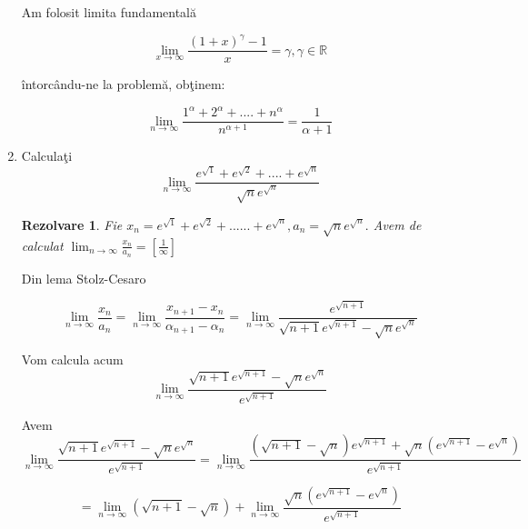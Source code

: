 \documentclass[a4paper,12pt,oneside]{report}
\newtheorem{solve}{Rezolvare}
\begin{document}
\begin{enumerate}
Am folosit limita fundamental\u a 

\begin{displaymath}
  \lim_{x \to \infty }\frac{\left ( 1+x \right )^{\gamma }-1}{x} = \gamma ,\gamma \in \mathbb{R}
\end{displaymath}


\^ intorc\^ andu-ne la problem\u a, ob\c tinem:

\begin{displaymath}
  \lim_{n \to \infty }\frac{1^{\alpha }+2^{\alpha }+....+n^{\alpha }}{n^{\alpha +1}} = \frac{1}{\alpha +1}
\end{displaymath}


\item Calcula\c ti
\begin{displaymath}
  \lim_{n \to \infty }\frac{e^{\sqrt{1}}+ e^{\sqrt{2}}+....+e^{\sqrt{n}}}{\sqrt{n}e^{\sqrt{n}}}
\end{displaymath}


\begin{solve}
  Fie \( x_{n} = e^{\sqrt{1}}+ e^{\sqrt{2}}+......+e^{\sqrt{n}}, a_{n}= \sqrt{n}e^{\sqrt{n}}.\) Avem de calculat \(\lim_{n \to \infty }\frac{x_{n}}{a_{n}}= \left [ \frac{1}{\infty } \right ]\)
\end{solve}



Din lema Stolz-Cesaro 


\begin{displaymath}
  \lim_{n \to \infty }\frac{x_{n}}{a_{n}}= \lim_{n \to \infty }\frac{x_{n+1}-x_{n}}{\alpha _{n+1}-\alpha _{n}}=\lim_{n \to \infty }\frac{e^{\sqrt{n+1}}}{\sqrt{n+1}e^{\sqrt{n+1}}-\sqrt{n}e^{\sqrt{n}}}
\end{displaymath}


Vom calcula acum 
\begin{displaymath}
  \lim_{n \to \infty }\frac{\sqrt{n+1}e^{\sqrt{n+1}}-\sqrt{n}e^{\sqrt{n}}}{e^{\sqrt{n+1}}}
\end{displaymath}


Avem 
\begin{displaymath}
  \lim_{n \to \infty }\frac{\sqrt{n+1}e^{\sqrt{n+1}}-\sqrt{n}e^{\sqrt{n}}}{e^{\sqrt{n+1}}} = \lim_{n \to \infty }\frac{\left ( \sqrt{n+1}-\sqrt{n} \right )e^{\sqrt{n+1}}+ \sqrt{n}\left ( e^{\sqrt{n+1}}-e^{\sqrt{n}} \right )}{e^{\sqrt{n+1}}}
\end{displaymath}

\begin{displaymath}
  = \lim_{n \to \infty }\left ( \sqrt{n+1}-\sqrt{n} \right )+ \lim_{n \to \infty }\frac{\sqrt{n}\left ( e^{\sqrt{n+1}} -e^{\sqrt{n}} \right )}{e^{\sqrt{n+1}}} 
\end{displaymath}



\end{enumerate}
\end{document}
